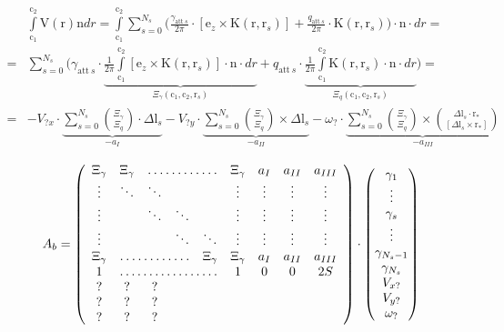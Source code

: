 \documentclass[14pt]{extreport}
\newcommand{\br}[1]{\boldsymbol{\mathrm{#1}}}
\renewcommand{\vec}[1]{\br{#1}}
\newcommand{\att}{\text{att}}
\begin{document}
\begin{equation}
\begin{split}
&\int\limits_{\vec c_1}^{\vec c_2} {\vec V(\vec r)\vec n dr}
= \int\limits_{\vec c_1}^{\vec c_2} {
	\sum\limits_{s=0}^{N_s} {
		\biggl (
		\frac{\gamma_{\att~s}}{2\pi} \cdot [\vec e_z \times \vec K(\vec r, \vec r_s)] +
		\frac{q_{\att~s}}{2\pi} \cdot \vec K(\vec r, \vec r_s)
		\biggr )
	}
	\cdot \vec n \cdot  dr
} = \\ =
&\sum\limits_{s=0}^{N_s} {
	\biggl (
	\gamma_{\att~s} \cdot 
	\underbrace{
	\frac{1}{2\pi}
	\int\limits_{\vec c_1}^{\vec c_2} {
		[\vec e_z \times \vec K(\vec r, \vec r_s)] \cdot \vec n \cdot dr
	}}_{\Xi_\gamma(\vec c_1, \vec c_2, \vec r_s)} + 
	q_{\att~s} \cdot
	\underbrace{
	\frac{1}{2\pi}
	\int\limits_{\vec c_1}^{\vec c_2} {
		\vec K(\vec r, \vec r_s) \cdot \vec n \cdot dr
	}}_{\Xi_q(\vec c_1, \vec c_2, \vec r_s)}
	\biggr )
} = \\ =
&-V_{?x} \cdot \underbrace{
	\sum\limits_{s=0}^{N_s} {\binom{\Xi_\gamma}{\Xi_q} \cdot \Delta \vec l_s}
}_{-a_I}
-V_{?y} \cdot \underbrace{
	\sum\limits_{s=0}^{N_s} {\binom{\Xi_\gamma}{\Xi_q} \times \Delta \vec l_s}
}_{-a_{II}}
-\omega_? \cdot \underbrace{
	\sum\limits_{s=0}^{N_s} {\binom{\Xi_\gamma}{\Xi_q} \times \binom{\Delta \vec l_s \cdot \vec r_*}{[\Delta \vec l_s \times \vec r_*]}}
}_{-a_{III}}
\end{split}
\end{equation}


\begin{equation}
\label{slae}
A_b = \left (
\begin{array}{ccccccccc}
\Xi_\gamma & \Xi_\gamma & \hdotsfor{3} & \Xi_\gamma & a_I & a_{II} & a_{III}\\
\vdots & \ddots & \ddots &&& \vdots & \vdots & \vdots & \vdots \\
\vdots && \ddots & \ddots && \vdots & \vdots & \vdots & \vdots \\
\vdots &&& \ddots & \ddots & \vdots & \vdots & \vdots & \vdots \\
\Xi_\gamma & \hdotsfor{3} & \Xi_\gamma & \Xi_\gamma & a_I & a_{II} & a_{III} \\
1 & \hdotsfor{4} & 1 & 0 & 0 & 2S \\
? & ? & ? \\
? & ? & ? \\
? & ? & ? \\
\end{array}
\right)
\cdot
\begin{pmatrix}
\gamma_1 \\ \vdots \\ \gamma_s \\ \vdots \\ \gamma_{N_s - 1} \\ \gamma_{N_s}
\\ V_{x?} \\ V_{y?} \\ \omega_?
\end{pmatrix}
\end{equation}
\end{document}
